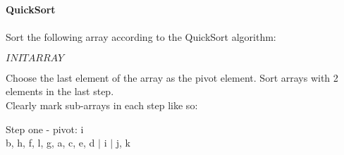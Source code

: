 \documentclass[12pt]{article}
\begin{document}
    \textbf{\LARGE{\color{tumgadPurple} QuickSort}}\\
    \\
    \noindent
    Sort the following array according to the QuickSort algorithm:
    \begin{center}
        $INITARRAY$
    \end{center}
    Choose the last element of the array as the pivot element. Sort arrays with 2 elements in the last step.\\
    Clearly mark sub-arrays in each step like so:
    \noindent
    \begin{center}
        Step one - pivot: i\\
        b, h, f, l, g, a, c, e, d $|$ i $|$ j, k\\
        \vspace{10px}
    \end{center}
\end{document}
